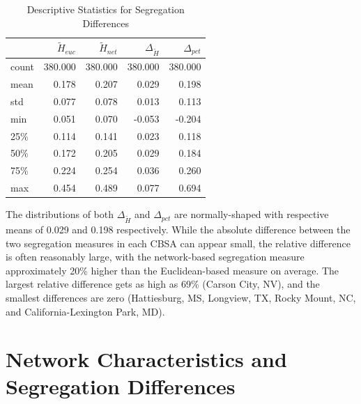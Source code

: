 \documentclass[
  10pt,
]{article}
\begin{document}
\begin{table}
\centering
\caption{Descriptive Statistics for Segregation Differences}
\label{tbl:diff_descriptives}
\begin{tabular}{lrrrr}
\toprule
{} &  $\tilde{H}_{euc}$ &  $\tilde{H}_{net}$ &  $\Delta_{\tilde{H}}$ &  $\Delta_{pct}$ \\
\midrule
count &            380.000 &            380.000 &               380.000 &         380.000 \\
mean  &              0.178 &              0.207 &                 0.029 &           0.198 \\
std   &              0.077 &              0.078 &                 0.013 &           0.113 \\
min   &              0.051 &              0.070 &                -0.053 &          -0.204 \\
25\%  &              0.114 &              0.141 &                 0.023 &           0.118 \\
50\%  &              0.172 &              0.205 &                 0.029 &           0.184 \\
75\%  &              0.224 &              0.254 &                 0.036 &           0.260 \\
max   &              0.454 &              0.489 &                 0.077 &           0.694 \\
\bottomrule
\end{tabular}
\end{table}

The distributions of both \(\Delta_{\tilde{H}}\) and \(\Delta_{pct}\)
are normally-shaped with respective means of 0.029 and 0.198
respectively. While the absolute difference between the two segregation
measures in each CBSA can appear small, the relative difference is often
reasonably large, with the network-based segregation measure
approximately 20\% higher than the Euclidean-based measure on average.
The largest relative difference gets as high as 69\% (Carson City, NV),
and the smallest differences are zero (Hattiesburg, MS, Longview, TX,
Rocky Mount, NC, and California-Lexington Park, MD).

\hypertarget{network-characteristics-and-segregation-differences}{%
\section{Network Characteristics and Segregation
Differences}\label{network-characteristics-and-segregation-differences}}
\end{document}
